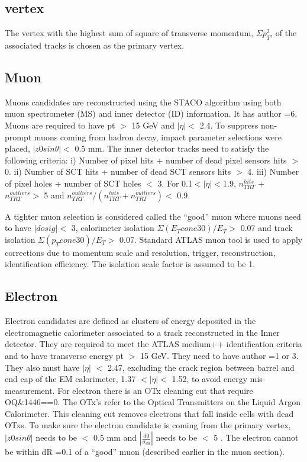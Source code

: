\subsection{vertex} 
The vertex with the highest sum of square of transverse momentum, $\Sigma p_{T}^{2}$, of the associated tracks is chosen as the primary vertex.

\subsection{Muon}
Muons candidates are reconstructed using the STACO algorithm using both muon spectrometer (MS) and inner detector (ID) information. It has author =6. Muons are required to have pt $>$ 15 GeV and $| \eta| <$ 2.4. To suppress non-prompt muons  coming from hadron decay, impact parameter selections were placed, $|z0sin\theta| <$ 0.5 mm.  The inner detector tracks need to satisfy the following criteria: 
i)	Number of pixel hits + number of dead pixel sensors hits $>$ 0. 
ii)	Number of SCT hits + number of dead SCT sensors hits $>$ 4.
iii)	Number of pixel holes + number of SCT holes $<$ 3. For 0.1$< |\eta |<$1.9, $n_{TRT}^{hits}$ + $n_{TRT}^{outliers} >$ 5 and  $n_{TRT}^{outliers}/( n_{TRT}^{hits} + n_{TRT}^{outliers} ) <$ 0.9.

A tighter muon selection is considered called the “good” muon where muons need to have $|dosig| <$ 3, calorimeter isolation $\Sigma(E_{T}cone30)/E_{T}>$ 0.07 and track isolation $\Sigma(p_{T}cone30)/E_{T}>$ 0.07.
Standard ATLAS muon tool is used to apply corrections due to momentum scale and resolution, trigger, reconstruction, identification efficiency. The isolation scale factor is assumed to be 1.

\subsection{Electron}
Electron candidates are defined as clusters of energy deposited in the electromagnetic calorimeter associated to a track reconstructed in the Inner detector. They are required to meet the ATLAS medium++ identification criteria and to have transverse energy pt $>$ 15 GeV. They need to have author =1 or 3. They also must have $|\eta|$ $<$ 2.47, excluding the crack region between barrel and end cap of the EM calorimeter, 1.37 $< |\eta| <$ 1.52, to avoid energy mis-measurement.
For electron there is an OTx cleaning cut that require OQ\&1446==0. 
The OTx’s refer to the Optical Transmitters on the Liquid Argon Calorimeter. This cleaning cut removes electrons that fall inside cells with dead OTxs. To make sure the electron candidate is coming from the primary vertex,$| z0 sin \theta|$ needs to be $<$ 0.5 mm and $| \frac{d0}{\sigma_{d0}} |$ needs to be $<$ 5 .  The electron cannot be within dR =0.1 of a “good” muon (described earlier in the muon section).

